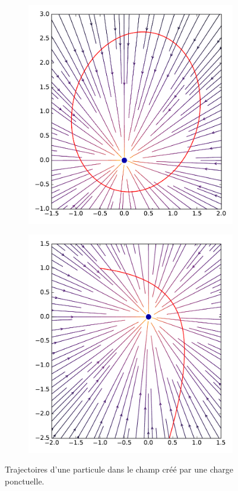 \documentclass{article}
\theoremstyle{definition}
\theoremstyle{remark}
\begin{document}
\begin{figure}[h]
	\centering
	\begin{subfigure}{0.45\textwidth}
		\includegraphics[width=\textwidth]{parts/electrostat/traj_1charge_ellipse.pdf}
	\end{subfigure}
	\begin{subfigure}{0.45\textwidth}
		\includegraphics[width=\textwidth]{parts/electrostat/traj_1charge_diverg.pdf}
	\end{subfigure}
	
	\caption{Trajectoires d'une particule dans le champ créé par une charge ponctuelle.}
\end{figure}
\end{document}
